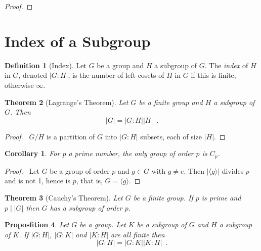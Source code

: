 \documentclass{book}
\let\qed\relax
\newtheorem{prop}{Proposfition}[chapter]
\newtheorem{thm}[prop]{Theorem}
\newtheorem{cor}{Corollary}[prop]
\theoremstyle{definition}
\newtheorem{df}[prop]{Definition}
\begin{document}
\begin{proof}
\pf
{}
\qed
\end{proof}

\section{Index of a Subgroup}

\begin{df}[Index]
Let $G$ be a group and $H$ a subgroup of $G$. The \emph{index} of $H$ in $G$, denoted $|G:H|$, is the number of left cosets of $H$ in $G$ if this is finite, otherwise $\infty$.
\end{df}

\begin{thm}[Lagrange's Theorem]
Let $G$ be a finite group and $H$ a subgroup of $G$. Then
\[ |G| = |G : H| |H| \enspace . \]
\end{thm}

\begin{proof}
\pf\ $G/H$ is a partition of $G$ into $|G:H|$ subsets, each of size $|H|$. \qed
\end{proof}

\begin{cor}
For $p$ a prime number, the only group of order $p$ is $C_p$.
\end{cor}

\begin{proof}
\pf\ Let $G$ be a group of order $p$ and $g \in G$ with $g \neq e$. Then $|\langle g \rangle|$ divides $p$ and is not 1, hence is $p$, that is, $G = \langle g \rangle$. \qed
\end{proof}

\begin{thm}[Cauchy's Theorem]
Let $G$ be a finite group. If $p$ is prime and $p \mid |G|$ then $G$ has a subgroup of order $p$.
\end{thm}


\begin{prop}
Let $G$ be a group. Let $K$ be a subgroup of $G$ and $H$ a subgroup of $K$. If $|G:H|$, $|G:K|$ and $|K:H|$ are all finite then
\[ |G:H| = |G:K| |K:H| \enspace . \]
\end{prop}
\end{document}
